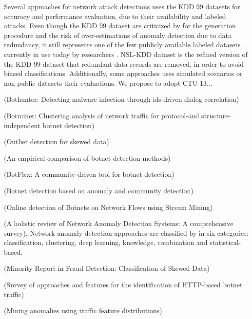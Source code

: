 \documentclass[review]{elsarticle}
\begin{document}
Several approaches for network attack detections uses the KDD 99 \cite{ji2016multi,ahmed2016survey,osanaiye2016distributed,bhuyan2014network} datasets for accuracy and performance evaluation, due to their availability and labeled attacks. Even though the KDD 99 dataset are criticized by for the generation procedure and the risk of over-estimations of anomaly detection due to data redundancy, it still represents one of the few publicly available labeled datasets currently in use today by researchers \cite{osanaiye2016distributed,bhuyan2014network}. NSL-KDD \cite{tavallaee2009detailed} dataset is the refined version of the KDD 99 dataset that redundant data records are removed, in order to avoid biased classifications. Additionally, some approaches uses simulated \cite{callegari2011novel} scenarios or non-public datasets their evaluations. We propose to adopt CTU-13...



\cite{gu2007bothunter} (Bothunter: Detecting malware infection through ids-driven dialog correlation)

\cite{gu2008botminer} (Botminer: Clustering analysis of network traffic for protocol-and structure-independent botnet detection)

\cite{hubert2008outlier} (Outlier detection for skewed data)

\cite{garcia2014empirical} (An empirical comparison of botnet detection methods)

\cite{khattak2015botflex} (BotFlex: A community-driven tool for botnet detection)

\cite{wang2017botnet} (Botnet detection based on anomaly and community detection)

\cite{da2018online} (Online detection of Botnets on Network Flows using Stream Mining)

\cite{moustafa2019holistic} (A holistic review of Network Anomaly Detection Systems: A comprehensive survey). Network anomaly detection approaches are classified by \cite{moustafa2019holistic} in six categories: classification, clustering, deep learning, knowledge, combination and statistical-based.

\cite{Phua2004minority} (Minority Report in Fraud Detection: Classification of Skewed Data)

\cite{acarali2016survey} (Survey of approaches and features for the identification of HTTP-based botnet traffic)

\cite{lakhina2005mining} (Mining anomalies using traffic feature distributions)
\end{document}
